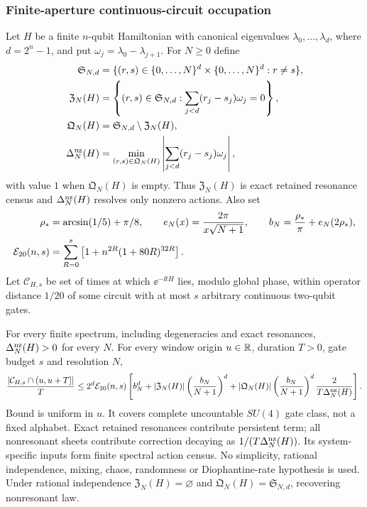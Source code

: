 \subsubsection{Finite-aperture continuous-circuit occupation}

Let $H$ be a finite $n$-qubit Hamiltonian with canonical eigenvalues
$\lambda_0,\ldots,\lambda_d$, where $d=2^n-1$, and put
$\omega_j=\lambda_0-\lambda_{j+1}$.  For $N\ge0$ define
\begin{align}
 \mathfrak S_{N,d}&=\{(r,s)\in\{0,\ldots,N\}^{d}
   \times\{0,\ldots,N\}^{d}:r\ne s\},                         \notag\\
 \mathfrak Z_N(H)&=\left\{(r,s)\in\mathfrak S_{N,d}:
   \sum_{j<d}(r_j-s_j)\omega_j=0\right\},                     \notag\\
 \mathfrak Q_N(H)&=\mathfrak S_{N,d}\setminus\mathfrak Z_N(H),\notag\\
 \Delta_N^{\rm nz}(H)&=\min_{(r,s)\in\mathfrak Q_N(H)}
   \left|\sum_{j<d}(r_j-s_j)\omega_j\right|,                 \label{eq:finitewindowdetuning-general}
\end{align}
with value $1$ when $\mathfrak Q_N(H)$ is empty.  Thus
$\mathfrak Z_N(H)$ is exact retained resonance census and
$\Delta_N^{\rm nz}(H)$ resolves only nonzero actions.  Also set
\begin{align}
 \rho_*&=\arcsin(1/5)+\pi/8,\qquad
 e_N(x)=\frac{2\pi}{x\sqrt{N+1}},\qquad
 b_N=\frac{\rho_*}{\pi}+e_N(2\rho_*),                         \notag\\
 \mathcal E_{20}(n,s)&=\sum_{R=0}^{s}
   \left[1+n^{2R}(1+80R)^{32R}\right].                        \label{eq:finitewindowconstants-general}
\end{align}
Let $\mathcal C_{H,s}$ be set of times at which $\ee^{-\ii tH}$ lies,
modulo global phase, within operator distance $1/20$ of some circuit with at
most $s$ arbitrary continuous two-qubit gates.

\begin{theorem}
\label{thm:finitewindowcircuit}
For every finite spectrum, including degeneracies and exact resonances,
$\Delta_N^{\rm nz}(H)>0$ for every $N$.  For every window origin $u\in\mathbb R$,
duration $T>0$, gate budget $s$ and resolution $N$,
\begin{equation}
 \frac{|\mathcal C_{H,s}\cap(u,u+T]|}{T}
 \le 2^d\mathcal E_{20}(n,s)
 \left[b_N^d+|\mathfrak Z_N(H)|
 \left(\frac{b_N}{N+1}\right)^d
 +|\mathfrak Q_N(H)|\left(\frac{b_N}{N+1}\right)^d
 \frac{2}{T\Delta_N^{\rm nz}(H)}\right].
                                                               \label{eq:finitewindowcircuit}
\end{equation}
Bound is uniform in $u$.  It covers complete uncountable $SU(4)$ gate class,
not a fixed alphabet.  Exact retained resonances contribute persistent term;
all nonresonant sheets contribute correction decaying as
$1/(T\Delta_N^{\rm nz}(H))$.  Its system-specific inputs form finite spectral
action census.  No simplicity, rational independence, mixing, chaos,
randomness or Diophantine-rate hypothesis is used.  Under rational
independence $\mathfrak Z_N(H)=\varnothing$ and
$\mathfrak Q_N(H)=\mathfrak S_{N,d}$, recovering nonresonant law.
\end{theorem}

